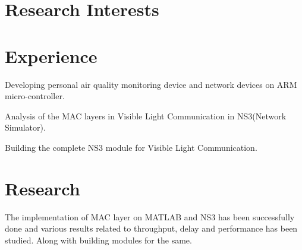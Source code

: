 \documentclass[]{deedy-resume-openfont}
\begin{document}
\begin{minipage}[t]{0.60\textwidth} 
\section{Research Interests}
\sectionsep
\hline
\section{Experience}
\begin{tightemize}
\vspace{\topsep}
\item Developing personal air quality monitoring device and network devices on ARM micro-controller.

\end{tightemize}

\sectionsep
{}
\begin{tightemize}
\vspace{\topsep}
\item Analysis of the MAC layers in Visible Light Communication in NS3(Network Simulator).
\item Building the complete NS3 module for Visible Light Communication.
\end{tightemize}
\sectionsep

\hline
\section{Research}
The implementation of MAC layer on MATLAB and NS3 has been successfully done and various results related to throughput, delay and performance has been studied. Along with building modules for the same.\\
\sectionsep


\end{minipage}
\end{document}
